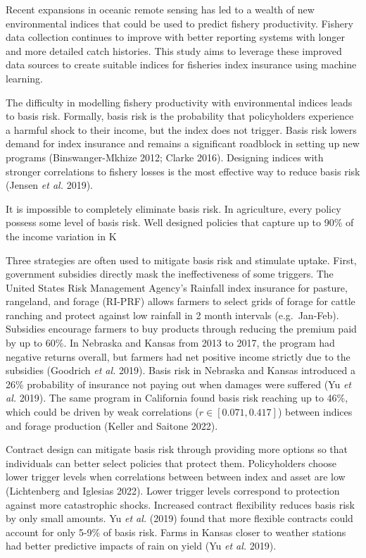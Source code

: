 \documentclass[
  letterpaper,
  DIV=11,
  numbers=noendperiod]{scrartcl}
\begin{document}
Recent expansions in oceanic remote sensing has led to a wealth of new
environmental indices that could be used to predict fishery
productivity. Fishery data collection continues to improve with better
reporting systems with longer and more detailed catch histories. This
study aims to leverage these improved data sources to create suitable
indices for fisheries index insurance using machine learning.

The difficulty in modelling fishery productivity with environmental
indices leads to basis risk. Formally, basis risk is the probability
that policyholders experience a harmful shock to their income, but the
index does not trigger. Basis risk lowers demand for index insurance and
remains a significant roadblock in setting up new programs
(Binswanger-Mkhize 2012; Clarke 2016). Designing indices with stronger
correlations to fishery losses is the most effective way to reduce basis
risk (Jensen \emph{et al.} 2019).

It is impossible to completely eliminate basis risk. In agriculture,
every policy possess some level of basis risk. Well designed policies
that capture up to 90\% of the income variation in K

Three strategies are often used to mitigate basis risk and stimulate
uptake. First, government subsidies directly mask the ineffectiveness of
some triggers. The United States Risk Management Agency's Rainfall index
insurance for pasture, rangeland, and forage (RI-PRF) allows farmers to
select grids of forage for cattle ranching and protect against low
rainfall in 2 month intervals (e.g.~Jan-Feb). Subsidies encourage
farmers to buy products through reducing the premium paid by up to 60\%.
In Nebraska and Kansas from 2013 to 2017, the program had negative
returns overall, but farmers had net positive income strictly due to the
subsidies (Goodrich \emph{et al.} 2019). Basis risk in Nebraska and
Kansas introduced a 26\% probability of insurance not paying out when
damages were suffered (Yu \emph{et al.} 2019). The same program in
California found basis risk reaching up to 46\%, which could be driven
by weak correlations (\(r \in[0.071,0.417]\)) between indices and forage
production (Keller and Saitone 2022).

Contract design can mitigate basis risk through providing more options
so that individuals can better select policies that protect them.
Policyholders choose lower trigger levels when correlations between
between index and asset are low (Lichtenberg and Iglesias 2022). Lower
trigger levels correspond to protection against more catastrophic
shocks. Increased contract flexibility reduces basis risk by only small
amounts. Yu \emph{et al.} (2019) found that more flexible contracts
could account for only 5-9\% of basis risk. Farms in Kansas closer to
weather stations had better predictive impacts of rain on yield (Yu
\emph{et al.} 2019).
\end{document}
